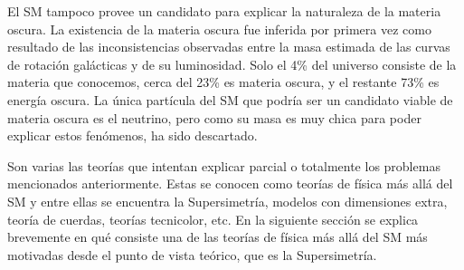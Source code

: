 El SM tampoco provee un candidato para explicar la naturaleza de la materia
oscura. La existencia de la materia oscura fue inferida por primera vez como
resultado de las inconsistencias observadas entre la masa estimada de las curvas
de rotación galácticas y de su luminosidad\cite{DM1}. Solo el 4\% del universo
consiste de la materia que conocemos\cite{DM2}, cerca del 23\% es
materia oscura, y el restante 73\% es energía oscura. La única partícula del SM
que podría ser un candidato viable de materia oscura es el neutrino, pero como
su masa es muy chica para poder explicar estos fenómenos, ha sido descartado.

Son varias las teorías que intentan explicar parcial o totalmente los problemas
mencionados anteriormente. Estas se conocen como teorías de física más allá del SM y entre
ellas se encuentra la Supersimetría, modelos con dimensiones extra, teoría de
cuerdas, teorías tecnicolor, etc. En la siguiente sección se explica brevemente
en qué consiste una de las teorías de física más allá del SM más motivadas desde
el punto de vista teórico, que es la Supersimetría.
